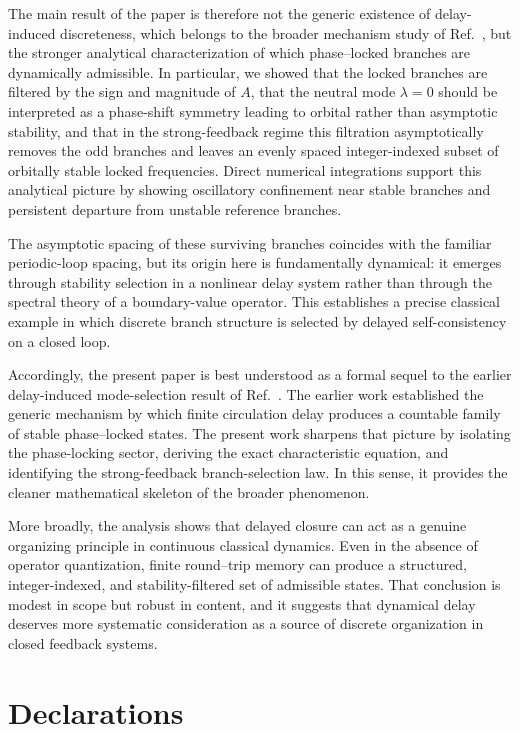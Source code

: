 \documentclass[11pt,a4paper]{article}
\begin{document}
    The main result of the paper is therefore not the generic existence of delay-induced discreteness, which belongs to the broader mechanism study of Ref.~\cite{Iskandarani2026DelayModeSelection}, but the stronger analytical characterization of which phase--locked branches are dynamically admissible. In particular, we showed that the locked branches are filtered by the sign and magnitude of $A$, that the neutral mode $\lambda=0$ should be interpreted as a phase-shift symmetry leading to orbital rather than asymptotic stability, and that in the strong-feedback regime this filtration asymptotically removes the odd branches and leaves an evenly spaced integer-indexed subset of orbitally stable locked frequencies. Direct numerical integrations support this analytical picture by showing oscillatory confinement near stable branches and persistent departure from unstable reference branches.
    
    The asymptotic spacing of these surviving branches coincides with the familiar periodic-loop spacing, but its origin here is fundamentally dynamical: it emerges through stability selection in a nonlinear delay system rather than through the spectral theory of a boundary-value operator. This establishes a precise classical example in which discrete branch structure is selected by delayed self-consistency on a closed loop.
    
    Accordingly, the present paper is best understood as a formal sequel to the earlier delay-induced mode-selection result of Ref.~\cite{Iskandarani2026DelayModeSelection}. The earlier work established the generic mechanism by which finite circulation delay produces a countable family of stable phase--locked states. The present work sharpens that picture by isolating the phase-locking sector, deriving the exact characteristic equation, and identifying the strong-feedback branch-selection law. In this sense, it provides the cleaner mathematical skeleton of the broader phenomenon.
    
    More broadly, the analysis shows that delayed closure can act as a genuine organizing principle in continuous classical dynamics. Even in the absence of operator quantization, finite round--trip memory can produce a structured, integer-indexed, and stability-filtered set of admissible states. That conclusion is modest in scope but robust in content, and it suggests that dynamical delay deserves more systematic consideration as a source of discrete organization in closed feedback systems.

    \section*{Declarations}
\end{document}
